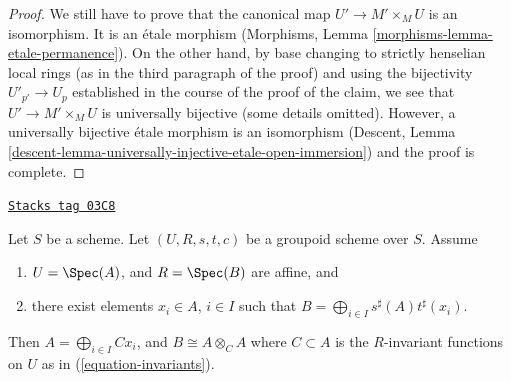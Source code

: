 \begin{proof}
\medskip\noindent
We still have to prove that the canonical map $U' \to M' \times_M U$
is an isomorphism. It is an \'etale morphism
(Morphisms, Lemma \ref{morphisms-lemma-etale-permanence}).
On the other hand, by base changing to strictly henselian local rings
(as in the third paragraph of the proof) and using the bijectivity
$U'_{p'} \to U_p$ established in the course of the proof of the claim,
we see that $U' \to M' \times_M U$ is universally bijective
(some details omitted). However, a universally bijective
\'etale morphism is an isomorphism
(Descent, Lemma \ref{descent-lemma-universally-injective-etale-open-immersion})
and the proof is complete.
\end{proof}

\begin{lemma}[Basis]
\label{groupoids-lemma-basis}
\href{https://stacks.math.columbia.edu/tag/03C8}{\texttt{Stacks tag 03C8}}

Let $S$ be a scheme.
Let $(U, R, s, t, c)$ be a groupoid scheme over $S$.
Assume
\begin{enumerate}
\item $U = \Spec(A)$, and $R = \Spec(B)$ are affine, and
\item there exist elements $x_i \in A$, $i \in I$ such that
$B = \bigoplus_{i \in I} s^\sharp(A)t^\sharp(x_i)$.
\end{enumerate}
Then $A = \bigoplus_{i\in I} Cx_i$, and $B \cong A \otimes_C A$
where $C \subset A$ is the $R$-invariant
functions on $U$ as in (\ref{equation-invariants}).
\end{lemma}

